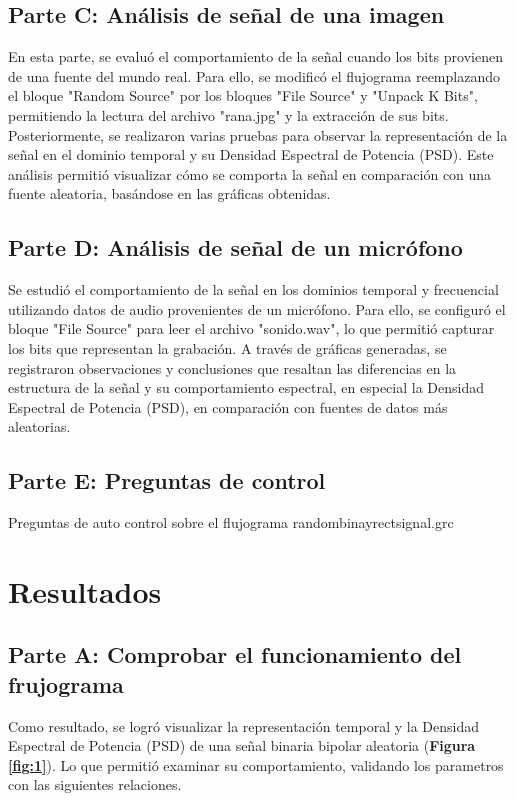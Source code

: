 \documentclass{journal}[IEEEtran, twocolumn]             %
\begin{document}
\begin{multicols}{2}
 
\subsection{Parte C: Análisis de señal de una imagen}
En esta parte, se evaluó el comportamiento de la señal cuando los bits provienen de una fuente del mundo real. Para ello, se modificó el flujograma reemplazando el bloque "Random Source" por los bloques "File Source" y "Unpack K Bits", permitiendo la lectura del archivo "rana.jpg" y la extracción de sus bits. Posteriormente, se realizaron varias pruebas para observar la representación de la señal en el dominio temporal y su Densidad Espectral de Potencia (PSD). Este análisis permitió visualizar cómo se comporta la señal en comparación con una fuente aleatoria, basándose en las gráficas obtenidas.

\subsection{Parte D: Análisis de señal de un micrófono}
Se estudió el comportamiento de la señal en los dominios temporal y frecuencial utilizando datos de audio provenientes de un micrófono. Para ello, se configuró el bloque "File Source" para leer el archivo "sonido.wav", lo que permitió capturar los bits que representan la grabación. A través de gráficas generadas, se registraron observaciones y conclusiones que resaltan las diferencias en la estructura de la señal y su comportamiento espectral, en especial la Densidad Espectral de Potencia (PSD), en comparación con fuentes de datos más aleatorias.

\subsection{Parte E: Preguntas de control}
Preguntas de auto control sobre el flujograma randombinayrectsignal.grc
    
\section{Resultados}
\subsection{Parte A: Comprobar el funcionamiento del frujograma}

Como resultado, se logró visualizar la representación temporal y la Densidad Espectral de Potencia (PSD) de una señal binaria bipolar aleatoria (\textbf{Figura \ref{fig:1}}). Lo que permitió examinar su comportamiento, validando los parametros con las siguientes relaciones.


\end{multicols}
\end{document}
